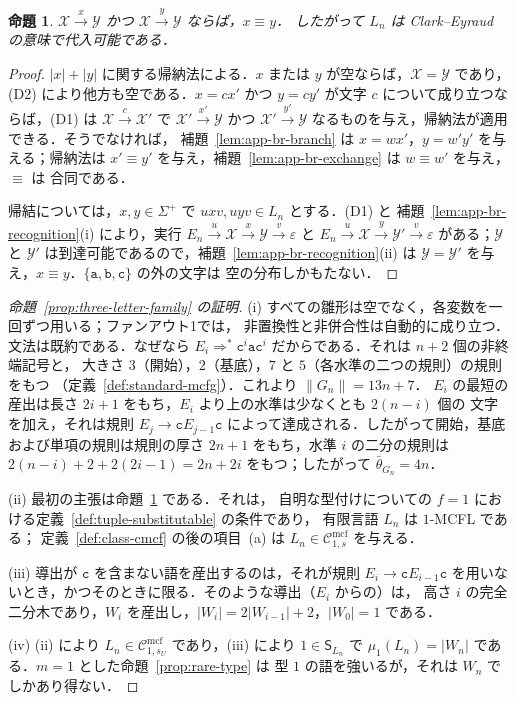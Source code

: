 \documentclass[11pt,a4paper]{ltjsarticle}
\numberwithin{equation}{section}
\theoremstyle{plain}
\newtheorem{proposition}[theorem]{命題}
\theoremstyle{definition}
\theoremstyle{remark}
\newcommand{\Cmcf}[2]{\mathcal{C}^{\mathrm{mcf}}_{#1,#2}}
\newcommand{\eps}{\varepsilon}
\theoremstyle{plain}
\begin{document}
\begin{proposition}\label{prop:app-br-congruence}
\label{prop:app-tl-congruence}
$\mathcal X\xrightarrow{x}\mathcal Y$ かつ $\mathcal X\xrightarrow{y}\mathcal Y$ ならば，$x\equiv y$．
したがって $L_n$ は Clark--Eyraud の意味で代入可能である．
\end{proposition}

\begin{proof}
$|x|+|y|$ に関する帰納法による．$x$ または $y$ が空ならば，$\mathcal X=\mathcal Y$ であり，
(D2) により他方も空である．$x=cx'$ かつ $y=cy'$ が文字 $c$ について成り立つならば，(D1) は
$\mathcal X\xrightarrow{c}\mathcal X'$ で $\mathcal X'\xrightarrow{x'}\mathcal Y$ かつ
$\mathcal X'\xrightarrow{y'}\mathcal Y$ なるものを与え，帰納法が適用できる．そうでなければ，
補題~\ref{lem:app-br-branch} は $x=wx'$，$y=w'y'$ を与える；帰納法は
$x'\equiv y'$ を与え，補題~\ref{lem:app-br-exchange} は $w\equiv w'$ を与え，$\equiv$ は
合同である．

帰結については，$x,y\in\Sigma^+$ で $uxv,uyv\in L_n$ とする．(D1) と
補題~\ref{lem:app-br-recognition}(i) により，実行
$E_n\xrightarrow{u}\mathcal X\xrightarrow{x}\mathcal Y\xrightarrow{v}\eps$ と
$E_n\xrightarrow{u}\mathcal X\xrightarrow{y}\mathcal Y'\xrightarrow{v}\eps$ がある；$\mathcal Y$ と
$\mathcal Y'$ は到達可能であるので，補題~\ref{lem:app-br-recognition}(ii) は
$\mathcal Y=\mathcal Y'$ を与え，$x\equiv y$．$\{\mathtt a,\mathtt b,\mathtt c\}$ の外の文字は
空の分布しかもたない．
\end{proof}

\begin{proof}[命題~\ref{prop:three-letter-family} の証明]
(i) すべての雛形は空でなく，各変数を一回ずつ用いる；ファンアウト1では，
非置換性と非併合性は自動的に成り立つ．文法は既約である．なぜなら
$E_i\Rightarrow^*\mathtt c^i\mathtt a\mathtt c^i$ だからである．それは $n+2$ 個の非終端記号と，
大きさ $3$（開始），$2$（基底），$7$ と $5$（各水準の二つの規則）の規則をもつ
（定義~\ref{def:standard-mcfg}）．これより $\|G_n\|=13n+7$．
$E_i$ の最短の産出は長さ $2i+1$ をもち，$E_i$ より上の水準は少なくとも $2(n-i)$ 個の
文字を加え，それは規則 $E_j\to\mathtt cE_{j-1}\mathtt c$ によって達成される．したがって開始，基底
および単項の規則は規則の厚さ $2n+1$ をもち，水準 $i$ の二分の規則は
$2(n-i)+2+2(2i-1)=2n+2i$ をもつ；したがって $\bar\theta_{G_n}=4n$．

(ii) 最初の主張は命題~\ref{prop:app-br-congruence} である．それは，
自明な型付けについての $f=1$ における定義~\ref{def:tuple-substitutable} の条件であり，
有限言語 $L_n$ は $1$-MCFL である；
定義~\ref{def:class-cmcf} の後の項目~(a) は $L_n\in\Cmcf{1}{s}$ を与える．

(iii) 導出が $\mathtt c$ を含まない語を産出するのは，それが規則
$E_i\to\mathtt cE_{i-1}\mathtt c$ を用いないとき，かつそのときに限る．そのような導出（$E_i$ からの）は，
高さ $i$ の完全二分木であり，$W_i$ を産出し，$|W_i|=2|W_{i-1}|+2$，$|W_0|=1$ である．

(iv) (ii) により $L_n\in\Cmcf{1}{s_U}$ であり，(iii) により $1\in \mathsf S_{L_n}$ で
$\mu_1(L_n)=|W_n|$ である．$m=1$ とした命題~\ref{prop:rare-type} は
型 $1$ の語を強いるが，それは $W_n$ でしかあり得ない．
\end{proof}
\end{document}
